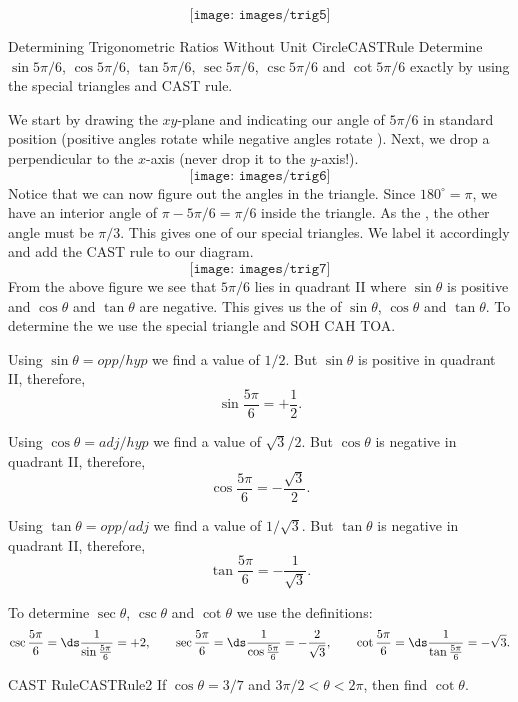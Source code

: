 $$\texttt{[image: images/trig5]}$$

\begin{example}{Determining Trigonometric Ratios Without Unit Circle}{CASTRule}
Determine $\sin 5\pi/6$, $\cos 5\pi/6$, $\tan 5\pi/6$, $\sec 5\pi/6$, $\csc 5\pi/6$ and $\cot 5\pi/6$ exactly by using the special triangles and CAST rule.
\end{example}

\begin{solution} 
We start by drawing the $xy$-plane and indicating our angle of $5\pi/6$ in standard position (positive angles rotate  while negative angles rotate ).
Next, we drop a perpendicular to the $x$-axis (never drop it to the $y$-axis!).
$$\texttt{[image: images/trig6]}$$
Notice that we can now figure out the angles in the triangle.
Since $180^\circ=\pi$, we have an interior angle of $\pi-5\pi/6=\pi/6$ inside the triangle. 
As the , the other angle must be $\pi/3$. 
This gives one of our special triangles.
We label it accordingly and add the CAST rule to our diagram.
$$\texttt{[image: images/trig7]}$$
From the above figure we see that $5\pi/6$ lies in quadrant II where $\sin\theta$ is positive and $\cos\theta$ and $\tan\theta$ are negative.
This gives us the  of $\sin\theta$, $\cos\theta$ and $\tan\theta$.
To determine the  we use the special triangle and SOH CAH TOA.

Using $\sin\theta=opp/hyp$ we find a value of $1/2$.
But $\sin\theta$ is positive in quadrant II, therefore, 
$$\sin \frac{5\pi}{6}=+\frac{1}{2}.$$

Using $\cos\theta=adj/hyp$ we find a value of $\sqrt 3/2$.
But $\cos\theta$ is negative in quadrant II, therefore, 
$$\cos \frac{5\pi}{6}=-\frac{\sqrt 3}{2}.$$

Using $\tan\theta=opp/adj$ we find a value of $1/\sqrt 3$.
But $\tan\theta$ is negative in quadrant II, therefore, 
$$\tan \frac{5\pi}{6}=-\frac{1}{\sqrt 3}.$$

To determine $\sec\theta$, $\csc\theta$ and $\cot\theta$ we use the definitions:
$$\csc \frac{5\pi}{6} = \ds\frac{1}{\sin \frac{5\pi}{6}} = +2,
\qquad \sec \frac{5\pi}{6} = \ds\frac{1}{\cos \frac{5\pi}{6}} = -\frac{2}{\sqrt 3},
\qquad\cot \frac{5\pi}{6} = \ds\frac{1}{\tan \frac{5\pi}{6}} = -\sqrt 3.$$
\end{solution}

\begin{example}{CAST Rule}{CASTRule2}
If $\cos\theta=3/7$ and $3\pi/2<\theta< 2\pi$, then find $\cot\theta$.
\end{example}

